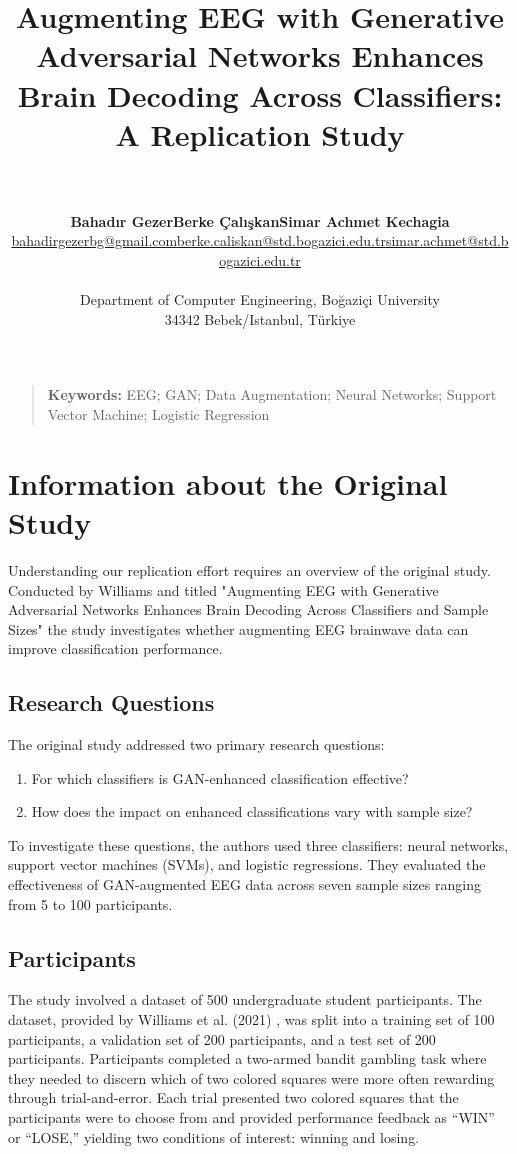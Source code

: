 \documentclass[10pt,letterpaper]{article}
\title{Augmenting EEG with Generative Adversarial Networks Enhances Brain Decoding Across Classifiers: A Replication Study}
\author{
\vspace{0.5cm} \\
\begin{tabular}{ccc}
{\large \bf Bahadır Gezer} & {\large \bf Berke Çalışkan} & {\large \bf Simar Achmet Kechagia} \\
\href{mailto:bahadirgezerbg@gmail.com}{bahadirgezerbg@gmail.com} & \href{mailto:berke.caliskan@std.bogazici.edu.tr}{berke.caliskan@std.bogazici.edu.tr} & \href{mailto:simar.achmet@std.bogazici.edu.tr}{simar.achmet@std.bogazici.edu.tr}
\end{tabular}
\vspace{0.2cm} \\
Department of Computer Engineering, Boğaziçi University \\
34342 Bebek/Istanbul, Türkiye
}
\begin{document}
\maketitle

\begin{quote}
\small
\textbf{Keywords:} 
EEG; GAN; Data Augmentation; Neural Networks; Support Vector Machine; Logistic Regression
\end{quote}

\section{Information about the Original Study}

Understanding our replication effort requires an overview of the original study. Conducted by Williams and titled "Augmenting EEG with Generative Adversarial Networks Enhances Brain Decoding Across Classifiers and Sample Sizes" \cite{originalpaper} the study investigates whether augmenting EEG brainwave data can improve classification performance.

\subsection{Research Questions}
The original study addressed two primary research questions: 
\begin{enumerate}
    \item For which classifiers is GAN-enhanced classification effective?
    \item How does the impact on enhanced classifications vary with sample size?
\end{enumerate}
To investigate these questions, the authors used three classifiers: neural networks, support vector machines (SVMs), and logistic regressions. They evaluated the effectiveness of GAN-augmented EEG data across seven sample sizes ranging from 5 to 100 participants.

\subsection{Participants}
The study involved a dataset of 500 undergraduate student participants. The dataset, provided by Williams et al. (2021) \cite{originaldataset}, was split into a training set of 100 participants, a validation set of 200 participants, and a test set of 200 participants. Participants completed a two-armed bandit gambling task where they needed to discern which of two colored squares were more often rewarding through trial-and-error. Each trial presented two colored squares that the participants were to choose from and provided performance feedback as “WIN” or “LOSE,” yielding two conditions of interest: winning and losing.
\end{document}
